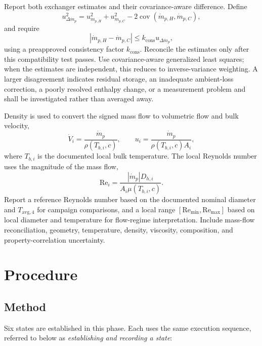 \documentclass[11pt]{article}
\newcommand{\Tavg}{T_{\mathrm{avg},4}}
\newcommand{\mdotp}{\dot m_{p}}
\newcommand{\mdotpH}{\dot m_{p,H}}
\newcommand{\mdotpC}{\dot m_{p,C}}
\newcommand{\Rey}{\mathrm{Re}}
\begin{document}
Report both exchanger estimates and their covariance-aware difference. Define
\begin{equation}
    u_{\Delta\mdotp}^2
    =
    u_{\mdotpH}^2+u_{\mdotpC}^2
    -2\operatorname{cov}(\mdotpH,\mdotpC),
\end{equation}
and require
\begin{equation}
    |\mdotpH-\mdotpC|
    \leq
    k_{\mathrm{cons}}u_{\Delta\mdotp},
    \label{eq:flow_consistency}
\end{equation}
using a preapproved consistency factor $k_{\mathrm{cons}}$. Reconcile the estimates only after this compatibility test passes. Use covariance-aware generalized least squares; when the estimates are independent, this reduces to inverse-variance weighting. A larger disagreement indicates residual storage, an inadequate ambient-loss correction, a poorly resolved enthalpy change, or a measurement problem and shall be investigated rather than averaged away.

Density is used to convert the signed mass flow to volumetric flow and bulk velocity,
\begin{equation}
    \dot V_i=\frac{\mdotp}{\rho(T_{b,i},c)},
    \qquad
    u_i=\frac{\mdotp}{\rho(T_{b,i},c)A_i},
\end{equation}
where $T_{b,i}$ is the documented local bulk temperature. The local Reynolds number uses the magnitude of the mass flow,
\begin{equation}
    \Rey_i
    =
    \frac{|\mdotp|D_{h,i}}
    {A_i\mu(T_{b,i},c)}.
    \label{eq:re_local}
\end{equation}
Report a reference Reynolds number based on the documented nominal diameter and $\Tavg$ for campaign comparisons, and a local range $[\Rey_{\min},\Rey_{\max}]$ based on local diameter and temperature for flow-regime interpretation. Include mass-flow reconciliation, geometry, temperature, density, viscosity, composition, and property-correlation uncertainty.



\clearpage
\section{Procedure}
\label{sec:procedure}
\label{sec:test_procedure}
\label{sec:initial_matrix}
\subsection{Method}

Six states are established in this phase. Each uses the same execution sequence, referred to below as \emph{establishing and recording a state}:
\end{document}
